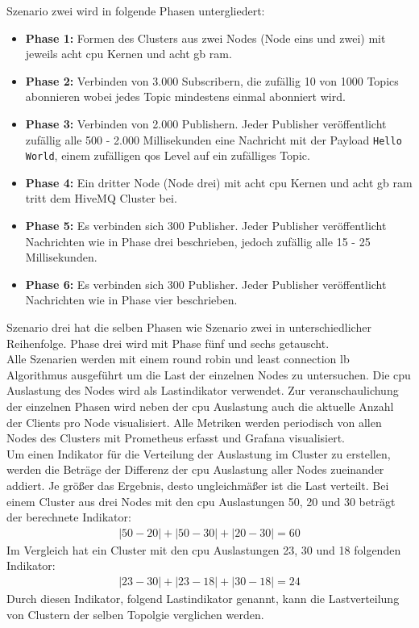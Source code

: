 Szenario zwei wird in folgende Phasen untergliedert:
\begin{itemize}
  \item \textbf{Phase 1:} Formen des Clusters aus zwei Nodes (Node eins und zwei) mit jeweils acht \ac{cpu} Kernen und acht \ac{gb} \ac{ram}.
  \item \textbf{Phase 2:} Verbinden von 3.000 Subscribern, die zufällig 10 von 1000 Topics abonnieren wobei jedes Topic mindestens einmal abonniert wird.
  \item \textbf{Phase 3:} Verbinden von 2.000 Publishern. Jeder Publisher veröffentlicht zufällig alle 500 - 2.000 Millisekunden eine Nachricht mit der Payload \verb|Hello World|, einem zufälligen \ac{qos} Level auf ein zufälliges Topic.
  \item \textbf{Phase 4:} Ein dritter Node (Node drei) mit acht \ac{cpu} Kernen und acht \ac{gb} \ac{ram} tritt dem HiveMQ Cluster bei.
  \item \textbf{Phase 5:} Es verbinden sich 300 Publisher. Jeder Publisher veröffentlicht Nachrichten wie in Phase drei beschrieben, jedoch zufällig alle 15 - 25 Millisekunden.
  \item \textbf{Phase 6:} Es verbinden sich 300 Publisher. Jeder Publisher veröffentlicht Nachrichten wie in Phase vier beschrieben.
\end{itemize}
Szenario drei hat die selben Phasen wie Szenario zwei in unterschiedlicher Reihenfolge. Phase drei wird mit Phase fünf und sechs getauscht.
\\
Alle Szenarien werden mit einem round robin und least connection \ac{lb} Algorithmus ausgeführt um die Last der einzelnen Nodes zu untersuchen. Die \ac{cpu} Auslastung des Nodes wird als Lastindikator verwendet. Zur veranschaulichung der einzelnen Phasen wird neben der \ac{cpu} Auslastung auch die aktuelle Anzahl der Clients pro Node visualisiert.
Alle Metriken werden periodisch von allen Nodes des Clusters mit Prometheus erfasst und Grafana visualisiert.
\\
Um einen Indikator für die Verteilung der Auslastung im Cluster zu erstellen, werden die Beträge der Differenz der \ac{cpu} Auslastung aller Nodes zueinander addiert. Je grö{\ss}er das Ergebnis, desto ungleichmä{\ss}er ist die Last verteilt.
Bei einem Cluster aus drei Nodes mit den \ac{cpu} Auslastungen 50, 20 und 30 beträgt der berechnete Indikator:
\begin{align}
   |50 - 20| + |50 - 30| + |20 - 30| = 60
\end{align}
Im Vergleich hat ein Cluster mit den \ac{cpu} Auslastungen 23, 30 und 18 folgenden Indikator:
\begin{align}
   |23 - 30| + |23 - 18| + |30 - 18| = 24
\end{align}
Durch diesen Indikator, folgend Lastindikator genannt, kann die Lastverteilung von Clustern der selben Topolgie verglichen werden.

